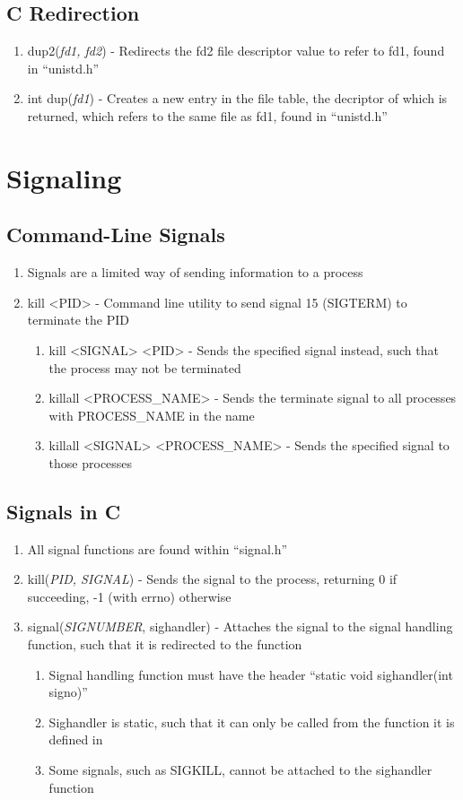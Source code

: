 \documentclass[11 pt, twoside]{article}
\begin{document}
\subsection{C Redirection}
\begin{enumerate}
\item dup2(\textit{fd1, fd2}) - Redirects the fd2 file descriptor value to refer to fd1, found in ``unistd.h''
\item int dup(\textit{fd1}) - Creates a new entry in the file table, the decriptor of which is returned, which refers to the same file as fd1, found in ``unistd.h''
\end{enumerate}

\section{Signaling}

\subsection{Command-Line Signals}
\begin{enumerate}
\item Signals are a limited way of sending information to a process
\item kill <PID> - Command line utility to send signal 15 (SIGTERM) to terminate the PID
\begin{enumerate}
\item kill <SIGNAL> <PID> - Sends the specified signal instead, such that the process may not be terminated
\item killall <PROCESS\_NAME> - Sends the terminate signal to all processes with PROCESS\_NAME in the name
\item killall <SIGNAL> <PROCESS\_NAME> - Sends the specified signal to those processes
\end{enumerate}
\end{enumerate}

\subsection{Signals in C}
\begin{enumerate}
\item All signal functions are found within ``signal.h''
\item kill(\textit{PID, SIGNAL}) - Sends the signal to the process, returning 0 if succeeding, -1 (with errno) otherwise
\item signal(\textit{SIGNUMBER}, sighandler) - Attaches the signal to the signal handling function, such that it is redirected to the function
\begin{enumerate}
\item Signal handling function must have the header ``static void sighandler(int signo)''
\item Sighandler is static, such that it can only be called from the function it is defined in
\item Some signals, such as SIGKILL, cannot be attached to the sighandler function
\end{enumerate}
\end{enumerate}
\end{document}
